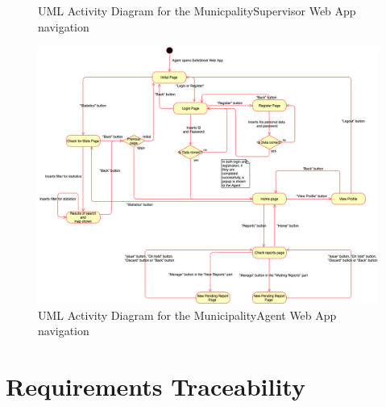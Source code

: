 \documentclass[a4paper]{report}
\begin{document}
{\begin{landscape}
\begin{figure}[hp]
\caption{UML Activity Diagram for the MunicpalitySupervisor Web App navigation}
\label{fig:SupWebApp-activity}
\end{figure}
\begin{figure}[hp]
\includegraphics[angle=0, scale=0.50]{Activity_diagram_WebApp}
\caption{UML Activity Diagram for the MunicipalityAgent Web App navigation}
\label{fig:AgentWebApp-activity}
\end{figure}
\end{landscape}
}

\chapter{Requirements Traceability}
\end{document}
